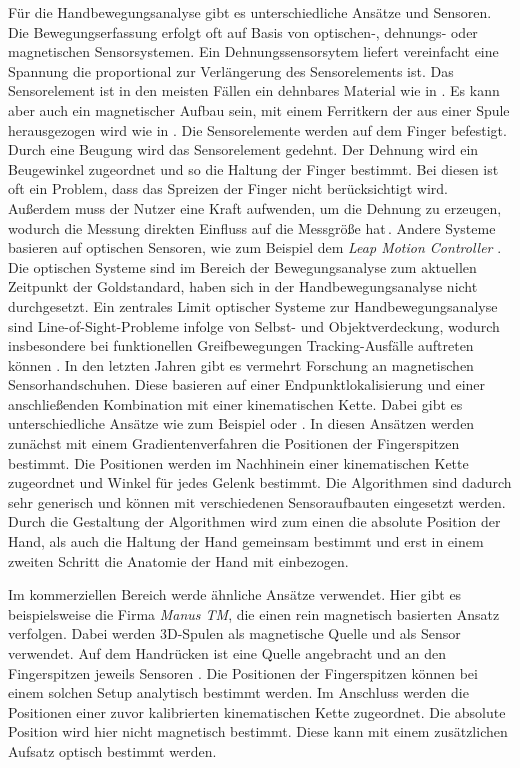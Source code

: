    Für die Handbewegungsanalyse gibt es unterschiedliche Ansätze und Sensoren. Die Bewegungserfassung erfolgt oft auf Basis von optischen-, dehnungs- oder magnetischen Sensorsystemen. 
   Ein Dehnungssensorsytem liefert vereinfacht eine Spannung die proportional zur Verlängerung des Sensorelements ist. Das Sensorelement ist in den meisten Fällen ein dehnbares Material wie in \cite{ruppel_elastic_2024}. Es kann aber auch ein magnetischer Aufbau sein, mit einem Ferritkern der aus einer Spule herausgezogen wird wie in \cite{kuroda_consumer_2004}. 
   Die Sensorelemente werden auf dem Finger befestigt. Durch eine Beugung wird das Sensorelement gedehnt. Der Dehnung wird ein Beugewinkel zugeordnet und so die Haltung der Finger bestimmt. Bei diesen ist oft ein Problem, dass das Spreizen der Finger nicht berücksichtigt wird. Außerdem muss der Nutzer eine Kraft aufwenden, um die Dehnung zu erzeugen, wodurch die Messung direkten Einfluss auf die Messgröße hat\,\cite{hu_fiber_2023}. 
   Andere Systeme basieren auf optischen Sensoren, wie zum Beispiel dem \textit{Leap Motion Controller} \cite{noauthor_ultraleap_nodate}. Die optischen Systeme sind im Bereich der Bewegungsanalyse zum aktuellen Zeitpunkt der Goldstandard, haben sich in der Handbewegungsanalyse nicht durchgesetzt. Ein zentrales Limit optischer Systeme zur Handbewegungsanalyse sind Line-of-Sight-Probleme infolge von Selbst- und Objektverdeckung, wodurch insbesondere bei funktionellen Greifbewegungen Tracking-Ausfälle auftreten können \cite{arnold_messmethoden_2026}.
   In den letzten Jahren gibt es vermehrt Forschung an magnetischen Sensorhandschuhen. Diese basieren auf einer Endpunktlokalisierung und einer anschließenden Kombination mit einer kinematischen Kette. Dabei gibt es unterschiedliche Ansätze wie zum Beispiel \cite{santoni_magik_2021} oder \cite{ma_magnetic_2011}. In diesen Ansätzen werden zunächst mit einem Gradientenverfahren die Positionen der Fingerspitzen bestimmt. Die Positionen werden im Nachhinein einer kinematischen Kette zugeordnet und Winkel für jedes Gelenk bestimmt. Die Algorithmen sind dadurch sehr generisch und können mit verschiedenen Sensoraufbauten eingesetzt werden. Durch die Gestaltung der Algorithmen wird zum einen die absolute Position der Hand, als auch die Haltung der Hand gemeinsam bestimmt und erst in einem zweiten Schritt die Anatomie der Hand mit einbezogen. 

   Im kommerziellen Bereich werde ähnliche Ansätze verwendet. Hier gibt es beispielsweise die Firma \textit{Manus TM}, die einen rein magnetisch basierten Ansatz verfolgen. Dabei werden 3D-Spulen als magnetische Quelle und als Sensor verwendet. Auf dem Handrücken ist eine Quelle angebracht und an den Fingerspitzen jeweils Sensoren \cite{saggio_quasi-static_2025}. Die Positionen der Fingerspitzen können bei einem solchen Setup analytisch bestimmt werden. Im Anschluss werden die Positionen einer zuvor kalibrierten kinematischen Kette zugeordnet. Die absolute Position wird hier nicht magnetisch bestimmt. Diese kann mit einem zusätzlichen Aufsatz optisch bestimmt werden.

